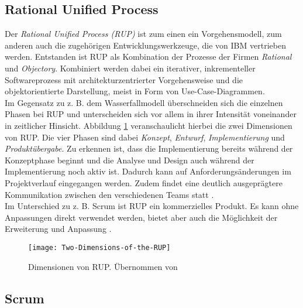 


\subsection{Rational Unified Process}
\label{sec:zusammenarbeit:rup}

Der \emph{Rational Unified Process (RUP)} ist zum einen ein Vorgehensmodell, zum anderen auch die zugehörigen Entwicklungswerkzeuge, die von IBM vertrieben werden. Entstanden ist RUP als Kombination der Prozesse der Firmen \emph{Rational} und \emph{Objectory}. Kombiniert werden dabei ein iterativer, inkrementeller Softwareprozess mit architekturzentrierter Vorgehensweise und die objektorientierte Darstellung, meist in Form von Use-Case-Diagrammen. \cite[49,50]{Hughes:2015:Agile:05}
\\
Im Gegensatz zu z. B. dem Wasserfallmodell überschneiden sich die einzelnen Phasen bei RUP und unterscheiden sich vor allem in ihrer Intensität voneinander in zeitlicher Hinsicht. Abbildung \ref{fig:rup} veranschaulicht hierbei die zwei Dimensionen von RUP. Die vier Phasen sind dabei \emph{Konzept}, \emph{Entwurf}, \emph{Implementierung} und \emph{Produktübergabe}. Zu erkennen ist, dass die Implementierung bereits während der Konzeptphase beginnt und die Analyse und Design auch während der Implementierung noch aktiv ist. Dadurch kann auf Anforderungsänderungen im Projektverlauf eingegangen werden. Zudem findet eine deutlich ausgeprägtere Kommunikation zwischen den verschiedenen Teams statt \cite[6,7]{Versteegen:2000:Projektmanagement:25}. 
\\
Im Unterschied zu z. B. Scrum ist RUP ein kommerzielles Produkt. Es kann ohne Anpassungen direkt verwendet werden, bietet aber auch die Möglichkeit der Erweiterung und Anpassung \cite[31]{Kruchten:1999:Der-Rational:67}.




\begin{figure}
\centering
    \texttt{[image: Two-Dimensions-of-the-RUP]} 
    \caption{Dimensionen von RUP. Übernommen von \cite{Kruchten:2000:The-Rational:47}}
    \label{fig:rup}
\end{figure}

\subsection{Scrum}
\label{sec:zusammenarbeit:scrum}


